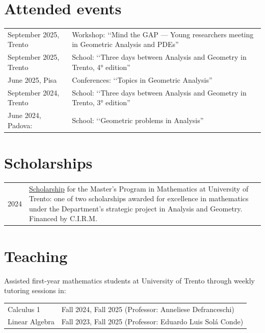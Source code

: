 \documentclass[a4paper,12pt]{article}
\begin{document}
\section{Attended events}
\begin{tabularx}{\linewidth}{@{}l X@{}}	
September 2025, Trento & Workshop: ‘‘Mind the GAP — Young researchers meeting in Geometric Analysis and PDEs''\\

September 2025, Trento & School: ‘‘Three days between Analysis and Geometry in Trento, 4° edition''\\

June 2025, Pisa & Conferences: ‘‘Topics in Geometric Analysis'' \\ 

September 2024, Trento & School: ‘‘Three days between Analysis and Geometry in Trento, 3° edition''\\

June 2024, Padova: & School: ‘‘Geometric problems in Analysis''
\end{tabularx}

\section{Scholarships}
\begin{tabularx}{\linewidth}{@{}l X@{}}
2024 & \href{https://cirm.fbk.eu/scholarships}{Scholarship} for the Master’s Program in Mathematics at University of Trento: one of two scholarships awarded for excellence in mathematics under the Department’s strategic project in Analysis and Geometry. Financed by C.I.R.M.
\end{tabularx}

\section{Teaching}
Assisted first-year mathematics students at University of Trento through weekly tutoring sessions in:\\
\begin{tabularx}{\linewidth}{@{}l X@{}}
Calculus 1 & Fall 2024, Fall 2025 (Professor: Anneliese Defranceschi)\\
Linear Algebra & Fall 2023, Fall 2025 (Professor: Eduardo Luis Solá Conde)
\end{tabularx}
\end{document}
